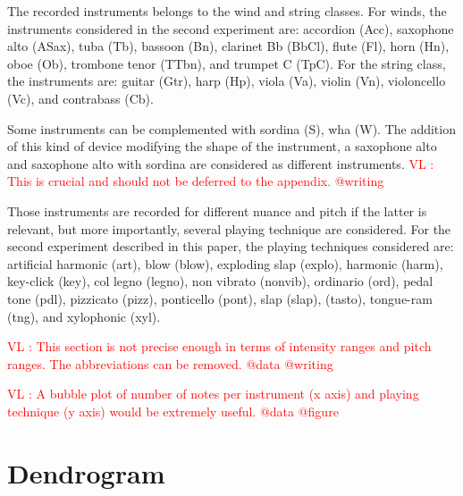 \documentclass{article}
\newcommand{\vl}[1]{\textcolor{red}{VL : #1}}
\begin{document}
The recorded instruments belongs to the wind and string classes. For winds, the instruments considered in the second experiment are: accordion (Acc), saxophone alto (ASax), tuba (Tb), bassoon (Bn), clarinet Bb (BbCl), flute (Fl), horn (Hn), oboe (Ob), trombone tenor (TTbn), and trumpet C (TpC). For the string class, the instruments are: guitar (Gtr), harp (Hp), viola (Va), violin (Vn), violoncello (Vc), and contrabass (Cb).

Some instruments can be complemented with sordina (S), wha (W). The addition of this kind of device modifying the shape of the instrument, a saxophone alto and saxophone alto with sordina are considered as different instruments.
\vl{This is crucial and should not be deferred to the appendix. @writing}

Those instruments are recorded for different nuance and pitch if the latter is relevant, but more importantly, several playing technique are considered. For  the second experiment described in this paper, the playing techniques considered are: artificial harmonic (art), blow (blow), exploding slap  (explo), harmonic (harm), key-click (key), col legno   (legno), non vibrato (nonvib), ordinario (ord), pedal tone (pdl), pizzicato (pizz), ponticello (pont), slap (slap), (tasto), tongue-ram (tng), and xylophonic (xyl).

\vl{This section is not precise enough in terms of intensity ranges and pitch ranges.
The abbreviations can be removed. @data @writing}

\vl{A bubble plot of number of notes per instrument (x axis) and playing technique
(y axis) would be extremely useful. @data @figure}

\section{Dendrogram}
\end{document}
